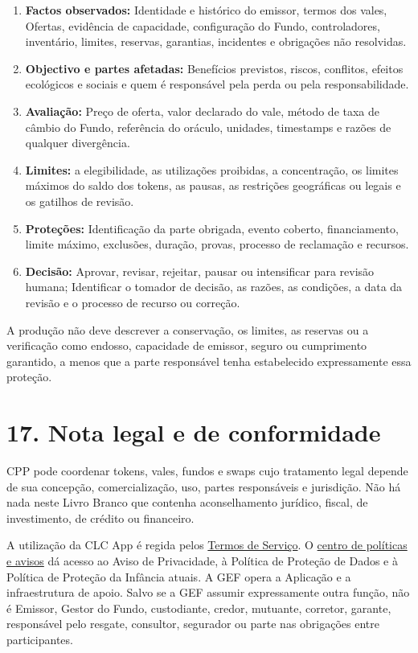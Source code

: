 \documentclass[11pt]{article}
\begin{document}
\begin{enumerate}[leftmargin=*]
\item \textbf{Factos observados:} Identidade e histórico do emissor, termos dos vales, Ofertas, evidência de capacidade, configuração do Fundo, controladores, inventário, limites, reservas, garantias, incidentes e obrigações não resolvidas.
\item \textbf{Objectivo e partes afetadas:} Benefícios previstos, riscos, conflitos, efeitos ecológicos e sociais e quem é responsável pela perda ou pela responsabilidade.
\item \textbf{Avaliação:} Preço de oferta, valor declarado do vale, método de taxa de câmbio do Fundo, referência do oráculo, unidades, timestamps e razões de qualquer divergência.
\item \textbf{Limites:} a elegibilidade, as utilizações proibidas, a concentração, os limites máximos do saldo dos tokens, as pausas, as restrições geográficas ou legais e os gatilhos de revisão.
\item \textbf{Proteções:} Identificação da parte obrigada, evento coberto, financiamento, limite máximo, exclusões, duração, provas, processo de reclamação e recursos.
\item \textbf{Decisão:} Aprovar, revisar, rejeitar, pausar ou intensificar para revisão humana; Identificar o tomador de decisão, as razões, as condições, a data da revisão e o processo de recurso ou correção.
\end{enumerate}
A produção não deve descrever a conservação, os limites, as reservas ou a verificação como endosso, capacidade de emissor, seguro ou cumprimento garantido, a menos que a parte responsável tenha estabelecido expressamente essa proteção.


\section*{17. Nota legal e de conformidade}

CPP pode coordenar tokens, vales, fundos e swaps cujo tratamento legal depende de sua concepção, comercialização, uso, partes responsáveis e jurisdição. Não há nada neste Livro Branco que contenha aconselhamento jurídico, fiscal, de investimento, de crédito ou financeiro.

A utilização da CLC App é regida pelos \href{https://docs.cosmolocal.credit/pt/governance/terms}{Termos de Serviço}. O \href{https://docs.cosmolocal.credit/pt/governance/policies}{centro de políticas e avisos} dá acesso ao Aviso de Privacidade, à Política de Proteção de Dados e à Política de Proteção da Infância atuais. A GEF opera a Aplicação e a infraestrutura de apoio. Salvo se a GEF assumir expressamente outra função, não é Emissor, Gestor do Fundo, custodiante, credor, mutuante, corretor, garante, responsável pelo resgate, consultor, segurador ou parte nas obrigações entre participantes.
\end{document}
